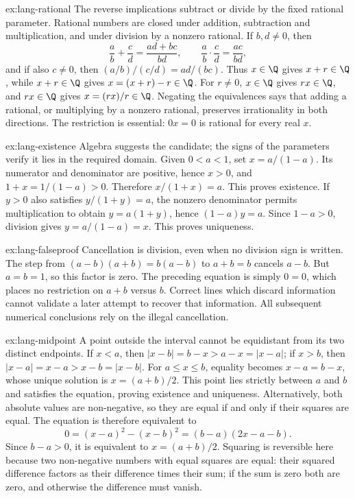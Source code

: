 \begin{solution}{ex:lang-rational}
\idea The reverse implications subtract or divide by the fixed rational parameter.
\writeup Rational numbers are closed under addition, subtraction and multiplication,
and under division by a nonzero rational. If $b,d\ne0$, then
\[
\frac ab+\frac cd=\frac{ad+bc}{bd},\qquad
\frac ab\cdot\frac cd=\frac{ac}{bd},
\]
and if also $c\ne0$, then $(a/b)/(c/d)=ad/(bc)$. Thus $x\in\Q$ gives $x+r\in\Q$, while
$x+r\in\Q$ gives $x=(x+r)-r\in\Q$.
For $r\ne0$, $x\in\Q$ gives $rx\in\Q$, and $rx\in\Q$ gives
$x=(rx)/r\in\Q$. Negating the equivalences says that adding a rational,
or multiplying by a nonzero rational, preserves irrationality in both directions.
The restriction is essential: $0x=0$ is rational for every real $x$.
\end{solution}

\begin{solution}{ex:lang-existence}
\idea Algebra suggests the candidate; the signs of the parameters verify it lies in the required domain.
\writeup Given $0<a<1$, set $x=a/(1-a)$. Its numerator and denominator
are positive, hence $x>0$, and $1+x=1/(1-a)>0$. Therefore
$x/(1+x)=a$. This proves existence.
If $y>0$ also satisfies $y/(1+y)=a$, the nonzero denominator permits
multiplication to obtain $y=a(1+y)$, hence $(1-a)y=a$. Since $1-a>0$,
division gives $y=a/(1-a)=x$. This proves uniqueness.
\end{solution}

\begin{solution}{ex:lang-falseproof}
\idea Cancellation is division, even when no division sign is written.
\writeup The step from $(a-b)(a+b)=b(a-b)$ to $a+b=b$ cancels $a-b$.
But $a=b=1$, so this factor is zero. The preceding equation is simply
$0=0$, which places no restriction on $a+b$ versus $b$. Correct lines
which discard information cannot validate a later attempt to recover that information.
All subsequent numerical conclusions rely on the illegal cancellation.
\end{solution}

\begin{solution}{ex:lang-midpoint}
\idea A point outside the interval cannot be equidistant from its two distinct endpoints.
\writeup If $x<a$, then $|x-b|=b-x>a-x=|x-a|$; if $x>b$, then
$|x-a|=x-a>x-b=|x-b|$. For $a\le x\le b$, equality becomes
$x-a=b-x$, whose unique solution is $x=(a+b)/2$. This point lies strictly
between $a$ and $b$ and satisfies the equation, proving existence and uniqueness.
Alternatively, both absolute values are non-negative, so they are equal
if and only if their squares are equal. The equation is therefore equivalent to
\[
0=(x-a)^2-(x-b)^2=(b-a)(2x-a-b).
\]
Since $b-a>0$, it is equivalent to $x=(a+b)/2$.
Squaring is reversible here because two non-negative numbers with equal squares
are equal: their squared difference factors as their difference times their sum;
if the sum is zero both are zero, and otherwise the difference must vanish.
\end{solution}

